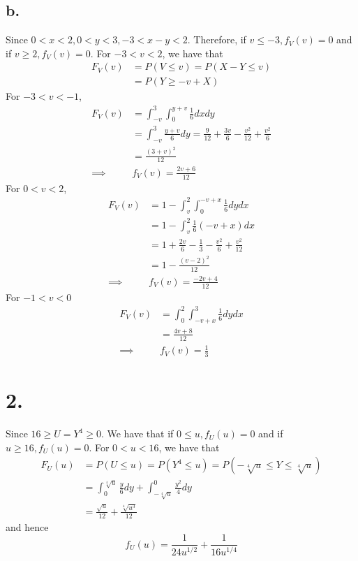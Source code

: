 \documentclass[11pt]{article}
\begin{document}
\subsection*{b.}
Since $0<x<2, 0<y<3, -3<x-y<2$. Therefore, if $v \le -3, f_V(v) = 0$ and if $v\ge 2, f_V(v) = 0$. 
For $-3<v<2$, we have that
\begin{equation*}
    \begin{aligned}
        F_V(v) &= P(V \le v) = P(X-Y\le v) \\ 
        &= P(Y\ge -v+X)         
    \end{aligned}
\end{equation*}
For $-3<v<-1$,
\begin{equation*}
    \begin{aligned}
        F_V(v) &= \int_{-v}^3 \int_{0}^{y+v} \frac{1}{6} dxdy \\
        &= \int_{-v}^3 \frac{y+v}{6} dy = \frac{9}{12} + \frac{3v}{6} -\frac{v^2}{12} + \frac{v^2}{6} \\
        &= \frac{(3+v)^2}{12} \\
        \implies & f_V(v) = \frac{2v+6}{12}
    \end{aligned}
\end{equation*} 
For $0<v<2$, 
\begin{equation*}
    \begin{aligned}
        F_V(v) &= 1- \int_v^2 \int_0^{-v+x} \frac{1}{6} dy dx \\
        &= 1- \int_v^2 \frac{1}{6}(-v+x) dx \\
        &= 1 +\frac{2v}{6} - \frac{1}{3} - \frac{v^2}{6} + \frac{v^2}{12}\\
        &= 1- \frac{(v-2)^2}{12} \\
        \implies & f_V(v) = \frac{-2v+4}{12}
    \end{aligned}
\end{equation*}
For $-1<v<0$
\begin{equation*}
    \begin{aligned}
        F_V(v) &= \int_0^2 \int_{-v+x}^3 \frac{1}{6} dydx \\
        &= \frac{4v+8}{12} \\
        \implies & f_V(v) = \frac{1}{3}
    \end{aligned}
\end{equation*}
\pagebreak
\section*{2.}
Since $ 16 \ge U = Y^4 \ge 0$. We have that if $0\le u, f_U(u) = 0$ and if $u\ge 16, f_U(u) = 0$.
For $0<u<16$, we have that
\begin{equation*}
    \begin{aligned}
        F_U(u) &= P(U\le u) = P(Y^4 \le u) = P(-\sqrt[4]{u} \le Y \le \sqrt[4]{u}) \\
        &=  \int_0^{\sqrt[4]{u}} \frac{y}{6} dy + \int_{-\sqrt[4]{u}}^0 \frac{y^2}{4} dy \\
        &= \frac{\sqrt{u}}{12} + \frac{\sqrt[4]{u^3}}{12}
    \end{aligned}
\end{equation*} 
and hence
\[
    f_U(u) = \frac{1}{24u^{1/2}} + \frac{1}{16u^{1/4}}    
\]
\pagebreak
\end{document}
